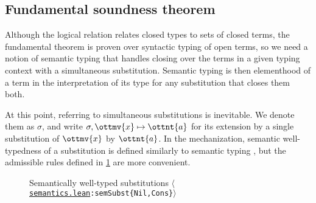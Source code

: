 \documentclass[a4paper,UKenglish,cleveref,autoref,thm-restate]{lipics-v2021}
\newcommand{\repo}{https://github.com/ionathanch/TTBFL}
\newcommand{\thmref}[2]{%
  $\langle$\href{\repo/tree/main/src/#1}{\texttt{#1}}\texttt{:#2}$\rangle$%
}
\begin{document}
\subsection{Fundamental soundness theorem}

Although the logical relation relates closed types to sets of closed terms,
the fundamental theorem is proven over syntactic typing of open terms,
so we need a notion of semantic typing that handles closing over the terms
in a given typing context with a simultaneous substitution.
Semantic typing is then elementhood of a term in the interpretation of its type
for any substitution that closes them both.

At this point, referring to simultaneous substitutions is inevitable.
We denote them as $\sigma$, and write $ \sigma ,  \ottmv{x}  \mapsto  \ottnt{a} $
for its extension by a single substitution of $\ottmv{x}$ by $\ottnt{a}$.
In the mechanization, semantic well-typedness of a substitution \fbox{$ \sigma  \vDash  \Gamma $}
is defined similarly to semantic typing ,
but the admissible rules defined in \cref{fig:sem:subst} are more convenient.


\begin{figure}
\caption{Semantically well-typed substitutions \thmref{semantics.lean}{semSubst\{Nil,Cons\}}}
\label{fig:sem:subst}
\end{figure}
\end{document}
